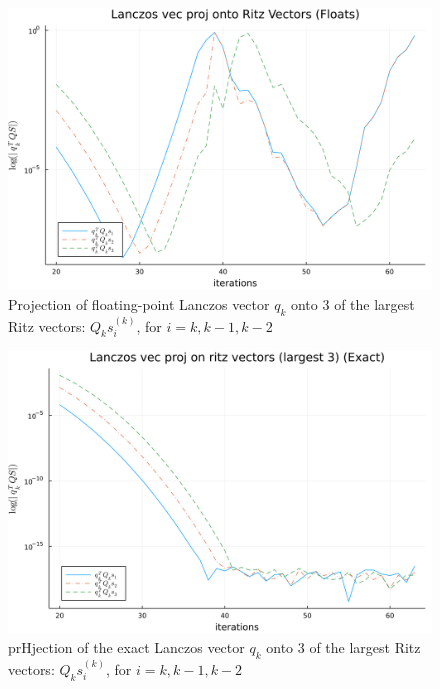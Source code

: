 \documentclass[]{article}
\theoremstyle{definition}
\begin{document}
            \begin{figure}[H]
                \centering
                \includegraphics[width=14cm]{lanczos_proj_on_ritz_float.png}
                \caption{Projection of floating-point Lanczos vector $q_k$ onto 3 of the largest Ritz vectors: $Q_ks_i^{(k)}$, for $i = k, k - 1, k - 2$
                }
            \end{figure}\label{fig:4}
            \begin{figure}[H]
                \centering
                \includegraphics[width=14cm]{lanczos_proj_on_ritz_exact.png}
                \caption{prHjection of the exact Lanczos vector $q_k$ onto 3 of the largest Ritz vectors: $Q_ks_i^{(k)}$, for $i = k, k - 1, k - 2$}
            \end{figure}\label{fig:5}
\end{document}
